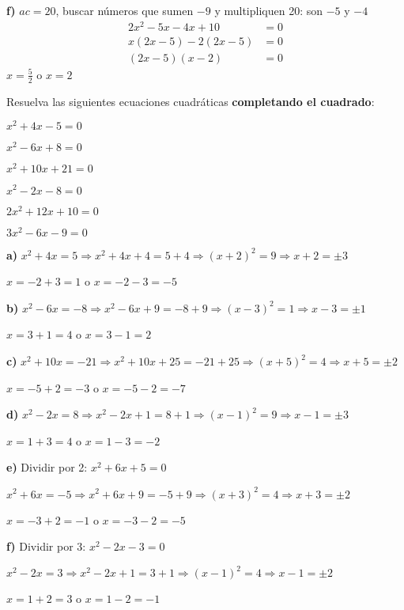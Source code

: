 \begin{exercise}
\begin{solucion}
\textbf{f)} $ac = 20$, buscar números que sumen $-9$ y multipliquen 20: son $-5$ y $-4$
\begin{align*}
2x^2 - 5x - 4x + 10 &= 0\\
x(2x - 5) - 2(2x - 5) &= 0\\
(2x - 5)(x - 2) &= 0
\end{align*}
$x = \frac{5}{2}$ o $x = 2$
\end{solucion}
\end{exercise}

\begin{exercise}
\problem Resuelva las siguientes ecuaciones cuadráticas \textbf{completando el cuadrado}:

\begin{exerciselist}
    \item $x^2 + 4x - 5 = 0$
    \item $x^2 - 6x + 8 = 0$
    \item $x^2 + 10x + 21 = 0$
    \item $x^2 - 2x - 8 = 0$
    \item $2x^2 + 12x + 10 = 0$
    \item $3x^2 - 6x - 9 = 0$
\end{exerciselist}

\begin{solucion}
\textbf{a)} $x^2 + 4x = 5 \Rightarrow x^2 + 4x + 4 = 5 + 4 \Rightarrow (x + 2)^2 = 9 \Rightarrow x + 2 = \pm 3$

$x = -2 + 3 = 1$ o $x = -2 - 3 = -5$

\textbf{b)} $x^2 - 6x = -8 \Rightarrow x^2 - 6x + 9 = -8 + 9 \Rightarrow (x - 3)^2 = 1 \Rightarrow x - 3 = \pm 1$

$x = 3 + 1 = 4$ o $x = 3 - 1 = 2$

\textbf{c)} $x^2 + 10x = -21 \Rightarrow x^2 + 10x + 25 = -21 + 25 \Rightarrow (x + 5)^2 = 4 \Rightarrow x + 5 = \pm 2$

$x = -5 + 2 = -3$ o $x = -5 - 2 = -7$

\textbf{d)} $x^2 - 2x = 8 \Rightarrow x^2 - 2x + 1 = 8 + 1 \Rightarrow (x - 1)^2 = 9 \Rightarrow x - 1 = \pm 3$

$x = 1 + 3 = 4$ o $x = 1 - 3 = -2$

\textbf{e)} Dividir por 2: $x^2 + 6x + 5 = 0$

$x^2 + 6x = -5 \Rightarrow x^2 + 6x + 9 = -5 + 9 \Rightarrow (x + 3)^2 = 4 \Rightarrow x + 3 = \pm 2$

$x = -3 + 2 = -1$ o $x = -3 - 2 = -5$

\textbf{f)} Dividir por 3: $x^2 - 2x - 3 = 0$

$x^2 - 2x = 3 \Rightarrow x^2 - 2x + 1 = 3 + 1 \Rightarrow (x - 1)^2 = 4 \Rightarrow x - 1 = \pm 2$

$x = 1 + 2 = 3$ o $x = 1 - 2 = -1$
\end{solucion}
\end{exercise}

